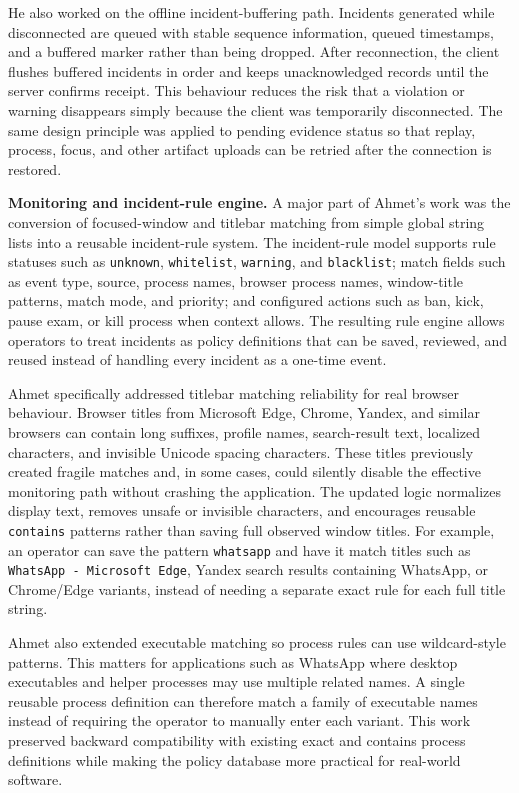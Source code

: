 He also worked on the offline incident-buffering path. Incidents generated while disconnected are queued with stable sequence information, queued timestamps, and a buffered marker rather than being dropped. After reconnection, the client flushes buffered incidents in order and keeps unacknowledged records until the server confirms receipt. This behaviour reduces the risk that a violation or warning disappears simply because the client was temporarily disconnected. The same design principle was applied to pending evidence status so that replay, process, focus, and other artifact uploads can be retried after the connection is restored.

\textbf{Monitoring and incident-rule engine.} A major part of Ahmet's work was the conversion of focused-window and titlebar matching from simple global string lists into a reusable incident-rule system. The incident-rule model supports rule statuses such as \texttt{unknown}, \texttt{whitelist}, \texttt{warning}, and \texttt{blacklist}; match fields such as event type, source, process names, browser process names, window-title patterns, match mode, and priority; and configured actions such as ban, kick, pause exam, or kill process when context allows. The resulting rule engine allows operators to treat incidents as policy definitions that can be saved, reviewed, and reused instead of handling every incident as a one-time event.

Ahmet specifically addressed titlebar matching reliability for real browser behaviour. Browser titles from Microsoft Edge, Chrome, Yandex, and similar browsers can contain long suffixes, profile names, search-result text, localized characters, and invisible Unicode spacing characters. These titles previously created fragile matches and, in some cases, could silently disable the effective monitoring path without crashing the application. The updated logic normalizes display text, removes unsafe or invisible characters, and encourages reusable \texttt{contains} patterns rather than saving full observed window titles. For example, an operator can save the pattern \texttt{whatsapp} and have it match titles such as \texttt{WhatsApp - Microsoft Edge}, Yandex search results containing WhatsApp, or Chrome/Edge variants, instead of needing a separate exact rule for each full title string.

Ahmet also extended executable matching so process rules can use wildcard-style patterns. This matters for applications such as WhatsApp where desktop executables and helper processes may use multiple related names. A single reusable process definition can therefore match a family of executable names instead of requiring the operator to manually enter each variant. This work preserved backward compatibility with existing exact and contains process definitions while making the policy database more practical for real-world software.

